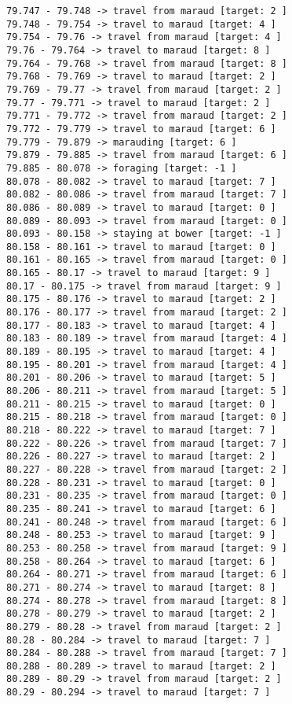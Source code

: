 \documentclass[11pt]{article}
\begin{document}
\begin{Verbatim}[commandchars=\\\{\}]
79.747 - 79.748 -> travel from maraud [target: 2 ]
79.748 - 79.754 -> travel to maraud [target: 4 ]
79.754 - 79.76 -> travel from maraud [target: 4 ]
79.76 - 79.764 -> travel to maraud [target: 8 ]
79.764 - 79.768 -> travel from maraud [target: 8 ]
79.768 - 79.769 -> travel to maraud [target: 2 ]
79.769 - 79.77 -> travel from maraud [target: 2 ]
79.77 - 79.771 -> travel to maraud [target: 2 ]
79.771 - 79.772 -> travel from maraud [target: 2 ]
79.772 - 79.779 -> travel to maraud [target: 6 ]
79.779 - 79.879 -> marauding [target: 6 ]
79.879 - 79.885 -> travel from maraud [target: 6 ]
79.885 - 80.078 -> foraging [target: -1 ]
80.078 - 80.082 -> travel to maraud [target: 7 ]
80.082 - 80.086 -> travel from maraud [target: 7 ]
80.086 - 80.089 -> travel to maraud [target: 0 ]
80.089 - 80.093 -> travel from maraud [target: 0 ]
80.093 - 80.158 -> staying at bower [target: -1 ]
80.158 - 80.161 -> travel to maraud [target: 0 ]
80.161 - 80.165 -> travel from maraud [target: 0 ]
80.165 - 80.17 -> travel to maraud [target: 9 ]
80.17 - 80.175 -> travel from maraud [target: 9 ]
80.175 - 80.176 -> travel to maraud [target: 2 ]
80.176 - 80.177 -> travel from maraud [target: 2 ]
80.177 - 80.183 -> travel to maraud [target: 4 ]
80.183 - 80.189 -> travel from maraud [target: 4 ]
80.189 - 80.195 -> travel to maraud [target: 4 ]
80.195 - 80.201 -> travel from maraud [target: 4 ]
80.201 - 80.206 -> travel to maraud [target: 5 ]
80.206 - 80.211 -> travel from maraud [target: 5 ]
80.211 - 80.215 -> travel to maraud [target: 0 ]
80.215 - 80.218 -> travel from maraud [target: 0 ]
80.218 - 80.222 -> travel to maraud [target: 7 ]
80.222 - 80.226 -> travel from maraud [target: 7 ]
80.226 - 80.227 -> travel to maraud [target: 2 ]
80.227 - 80.228 -> travel from maraud [target: 2 ]
80.228 - 80.231 -> travel to maraud [target: 0 ]
80.231 - 80.235 -> travel from maraud [target: 0 ]
80.235 - 80.241 -> travel to maraud [target: 6 ]
80.241 - 80.248 -> travel from maraud [target: 6 ]
80.248 - 80.253 -> travel to maraud [target: 9 ]
80.253 - 80.258 -> travel from maraud [target: 9 ]
80.258 - 80.264 -> travel to maraud [target: 6 ]
80.264 - 80.271 -> travel from maraud [target: 6 ]
80.271 - 80.274 -> travel to maraud [target: 8 ]
80.274 - 80.278 -> travel from maraud [target: 8 ]
80.278 - 80.279 -> travel to maraud [target: 2 ]
80.279 - 80.28 -> travel from maraud [target: 2 ]
80.28 - 80.284 -> travel to maraud [target: 7 ]
80.284 - 80.288 -> travel from maraud [target: 7 ]
80.288 - 80.289 -> travel to maraud [target: 2 ]
80.289 - 80.29 -> travel from maraud [target: 2 ]
80.29 - 80.294 -> travel to maraud [target: 7 ]

\end{Verbatim}
\end{document}

